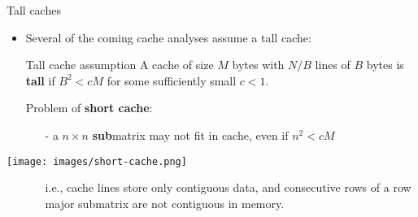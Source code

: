 \documentclass[t,usepdftitle=false]{beamer}
\begin{document}
\begin{frame}{Tall caches}
\begin{itemize}
\item Several of the coming cache analyses assume a tall cache:
\begin{block}{Tall cache assumption}
A cache of size $M$ bytes with $N/B$ lines of $B$ bytes is \textbf{tall} if $B^2<cM$ for some sufficiently small $c<1$.
\end{block}
Problem of \textbf{short cache}: 
\begin{itemize}\normalsize
\item[-] a $n\times n$ \textbf{sub}matrix may not fit in cache, even if $n^2<cM$
\end{itemize}
\end{itemize}
\begin{center}\texttt{[image: images/short-cache.png]}\end{center}
\begin{itemize}
\item[]
\begin{itemize}\normalsize
\item[] i.e., cache lines store only contiguous data, and consecutive rows of a row major submatrix are not contiguous in memory.
\end{itemize}
\end{itemize}

\end{frame}
\end{document}

